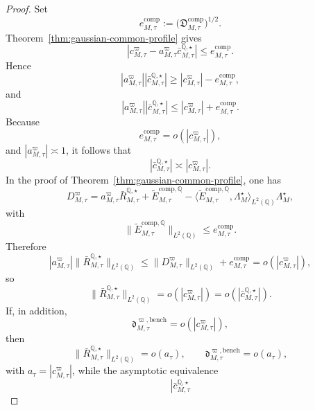 \documentclass[11pt,a4paper]{amsart}
\theoremstyle{plain}
\theoremstyle{definition}
\theoremstyle{remark}
\newcommand{\QQ}{\mathbb{Q}}
\begin{document}
\begin{proof}
Set
\[
        e_{M,\tau}^{\mathrm{comp}}
        :=
        \bigl(\mathfrak D_{M,\tau}^{\mathrm{comp}}\bigr)^{1/2}.
\]
Theorem~\ref{thm:gaussian-common-profile} gives
\[
        \left|
                c_{M,\tau}^\varpi
                -
                a_{M,\tau}^\varpi \bar c_{M,\tau}^{\QQ,\star}
        \right|
        \le
        e_{M,\tau}^{\mathrm{comp}}.
\]
Hence
\[
        |a_{M,\tau}^\varpi|
        \left|
                \bar c_{M,\tau}^{\QQ,\star}
        \right|
        \ge
        |c_{M,\tau}^\varpi|
        -
        e_{M,\tau}^{\mathrm{comp}},
\]
and
\[
        |a_{M,\tau}^\varpi|
        \left|
                \bar c_{M,\tau}^{\QQ,\star}
        \right|
        \le
        |c_{M,\tau}^\varpi|
        +
        e_{M,\tau}^{\mathrm{comp}}.
\]
Because
\[
        e_{M,\tau}^{\mathrm{comp}}
        =
        o\!\left(
                |c_{M,\tau}^\varpi|
        \right),
\]
and \(|a_{M,\tau}^\varpi|\asymp1\), it follows that
\[
        \left|
                \bar c_{M,\tau}^{\QQ,\star}
        \right|
        \asymp
        |c_{M,\tau}^\varpi|.
\]
In the proof of Theorem~\ref{thm:gaussian-common-profile}, one has
\[
        D_{M,\tau}^\varpi
        =
        a_{M,\tau}^\varpi \bar R_{M,\tau}^{\QQ,\star}
        +
        \widetilde E_{M,\tau}^{\mathrm{comp},\QQ}
        -
        \langle \widetilde E_{M,\tau}^{\mathrm{comp},\QQ},\Lambda_M^\star\rangle_{L^2(\QQ)}
        \Lambda_M^\star,
\]
with
\[
        \|\widetilde E_{M,\tau}^{\mathrm{comp},\QQ}\|_{L^2(\QQ)}
        \le
        e_{M,\tau}^{\mathrm{comp}}.
\]
Therefore
\[
        |a_{M,\tau}^\varpi|
        \|\bar R_{M,\tau}^{\QQ,\star}\|_{L^2(\QQ)}
        \le
        \|D_{M,\tau}^\varpi\|_{L^2(\QQ)}
        +
        e_{M,\tau}^{\mathrm{comp}}
        =
        o\!\left(
                |c_{M,\tau}^\varpi|
        \right),
\]
so
\[
        \|\bar R_{M,\tau}^{\QQ,\star}\|_{L^2(\QQ)}
        =
        o\!\left(
                |c_{M,\tau}^\varpi|
        \right)
        =
        o\!\left(
                \left|
                        \bar c_{M,\tau}^{\QQ,\star}
                \right|
        \right).
\]
If, in addition,
\[
        \mathfrak d_{M,\tau}^{\varpi,\mathrm{bench}}
        =
        o\!\left(
                |c_{M,\tau}^\varpi|
        \right),
\]
then
\[
        \|\bar R_{M,\tau}^{\QQ,\star}\|_{L^2(\QQ)}
        =
        o(a_\tau),
        \qquad
        \mathfrak d_{M,\tau}^{\varpi,\mathrm{bench}}
        =
        o(a_\tau),
\]
with \(a_\tau=|c_{M,\tau}^\varpi|\), while the asymptotic equivalence
\[
        \left|
                \bar c_{M,\tau}^{\QQ,\star}
\]
\end{proof}
\end{document}
